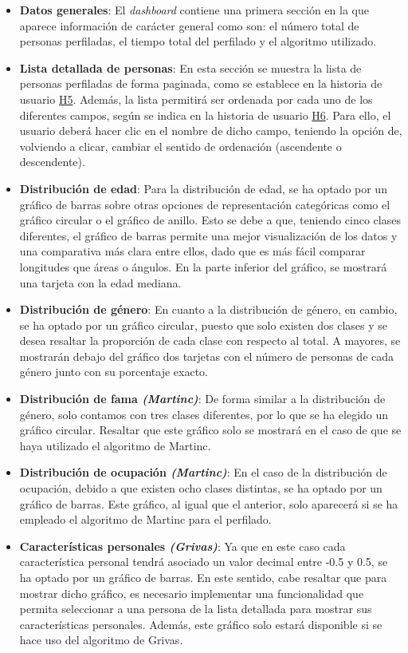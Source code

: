 \begin{itemize}
	\item \textbf{Datos generales}: El \textit{dashboard} contiene una primera sección en la que aparece información de carácter general
	      como son: el número total de personas perfiladas, el tiempo total del perfilado y el algoritmo utilizado.
	\item \textbf{Lista detallada de personas}: En esta sección se muestra la lista de personas perfiladas de forma paginada, como se establece en la historia de usuario \hyperref[req:hu5]{H5}. Además, la lista
	      permitirá ser ordenada por cada uno de los diferentes campos, según se indica en la historia de usuario \hyperref[req:hu6]{H6}. Para ello, el usuario deberá hacer clic en el nombre de dicho campo, teniendo
	      la opción de, volviendo a clicar, cambiar el sentido de ordenación (ascendente o descendente).
	\item \textbf{Distribución de edad}: Para la distribución de edad, se ha optado por un gráfico de barras sobre otras opciones de representación
	      categóricas como el gráfico circular o el gráfico de anillo. Esto se debe a que, teniendo cinco clases diferentes, el gráfico de barras permite una mejor visualización
	      de los datos y una comparativa más clara entre ellos, dado que es más fácil comparar longitudes que áreas o ángulos. En la parte inferior del gráfico,
	      se mostrará una tarjeta con la edad mediana.
	\item \textbf{Distribución de género}: En cuanto a la distribución de género, en cambio, se ha optado por un gráfico circular, puesto que solo existen dos clases
	      y se desea resaltar la proporción de cada clase con respecto al total. A mayores, se mostrarán debajo del gráfico dos tarjetas con el número de personas
	      de cada género junto con su porcentaje exacto.
	\item \textbf{Distribución de fama \textit{(Martinc)}}: De forma similar a la distribución de género, solo contamos con tres clases diferentes, por lo que
	      se ha elegido un gráfico circular. Resaltar que este gráfico solo se mostrará en el caso de que se haya utilizado el algoritmo de Martinc.
	\item \textbf{Distribución de ocupación \textit{(Martinc)}}: En el caso de la distribución de ocupación, debido a que existen ocho clases distintas, se ha optado
	      por un gráfico de barras. Este gráfico, al igual que el anterior, solo aparecerá si se ha empleado el algoritmo de Martinc para el perfilado.
	\item \textbf{Características personales \textit{(Grivas)}}: Ya que en este caso cada característica personal tendrá asociado un valor decimal entre -0.5 y 0.5,
	      se ha optado por un gráfico de barras. En este sentido, cabe resaltar que para mostrar dicho gráfico, es necesario implementar una funcionalidad que permita
	      seleccionar a una persona de la lista detallada para mostrar sus características personales. Además, este gráfico solo estará disponible si se hace uso del algoritmo de Grivas.
\end{itemize}

